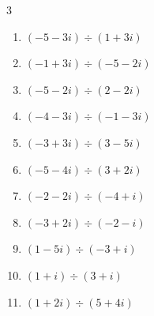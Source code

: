 \begin{multicols}{3}
\begin{enumerate}

  \item $\displaystyle (-5-3i)\div(1+3i)$


  \item $\displaystyle (-1+3i)\div(-5-2i)$


  \item $\displaystyle (-5-2i)\div(2-2i)$


  \item $\displaystyle (-4-3i)\div(-1-3i)$


  \item $\displaystyle (-3+3i)\div(3-5i)$


  \item $\displaystyle (-5-4i)\div(3+2i)$


\columnbreak %

  \item $\displaystyle (-2-2i)\div(-4+i)$


  \item $\displaystyle (-3+2i)\div(-2-i)$


  \item $\displaystyle (1-5i)\div(-3+i)$


  \item $\displaystyle (1+i)\div(3+i)$


  \item $\displaystyle (1+2i)\div(5+4i)$



\end{enumerate}
\end{multicols}
